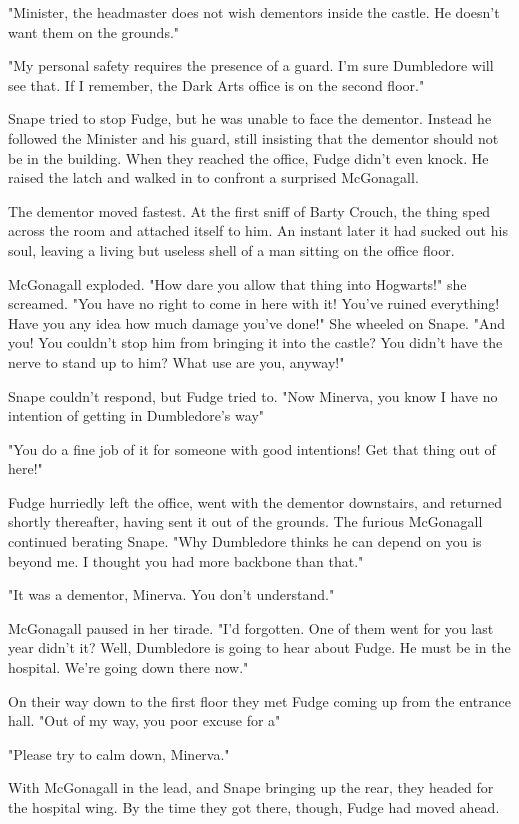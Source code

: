 "Minister, the headmaster does not wish dementors inside the castle. He doesn't want them on the grounds."

"My personal safety requires the presence of a guard. I'm sure Dumbledore will see that. If I remember, the Dark Arts office is on the second floor."

Snape tried to stop Fudge, but he was unable to face the dementor. Instead he followed the Minister and his guard, still insisting that the dementor should not be in the building. When they reached the office, Fudge didn't even knock. He raised the latch and walked in to confront a surprised McGonagall.

The dementor moved fastest. At the first sniff of Barty Crouch, the thing sped across the room and attached itself to him. An instant later it had sucked out his soul, leaving a living but useless shell of a man sitting on the office floor.

McGonagall exploded. "How dare you allow that{\el} thing into Hogwarts!" she screamed. "You have no right to come in here with it! You've ruined everything! Have you any idea how much damage you've done!" She wheeled on Snape. "And you! You couldn't stop him from bringing it into the castle? You didn't have the nerve to stand up to him? What use are you, anyway!"

Snape couldn't respond, but Fudge tried to. "Now Minerva, you know I have no intention of getting in Dumbledore's way{\el}"

"You do a fine job of it for someone with good intentions! Get that thing out of here!"

Fudge hurriedly left the office, went with the dementor downstairs, and returned shortly thereafter, having sent it out of the grounds. The furious McGonagall continued berating Snape. "Why Dumbledore thinks he can depend on you is beyond me. I thought you had more backbone than that."

"It was a dementor, Minerva. You don't understand."

McGonagall paused in her tirade. "I'd forgotten. One of them went for you last year didn't it? Well, Dumbledore is going to hear about Fudge. He must be in the hospital. We're going down there now."

On their way down to the first floor they met Fudge coming up from the entrance hall. "Out of my way, you poor excuse for a{\el}"

"Please try to calm down, Minerva."

With McGonagall in the lead, and Snape bringing up the rear, they headed for the hospital wing. By the time they got there, though, Fudge had moved ahead.

